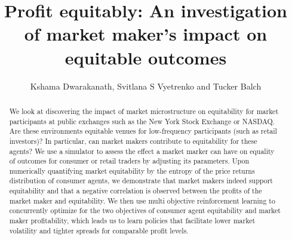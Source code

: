 \documentclass[sigconf]{acmart}
\begin{document}
\setlength{\abovedisplayskip}{3pt}
\setlength{\belowdisplayskip}{3pt}


\title{Profit equitably: An investigation of market maker's impact on equitable outcomes}

\author{Kshama Dwarakanath, Svitlana S Vyetrenko and Tucker Balch}

% 
\begin{abstract}
{
We look at discovering the impact of market microstructure
on equitability for market participants
at public exchanges such as the New York
Stock Exchange or NASDAQ. Are these environments
equitable venues for low-frequency participants
(such as retail investors)? In particular,
can market makers contribute to equitability for
these agents? We use a simulator to assess the effect a market marker can have on equality of outcomes for consumer or retail traders by adjusting its parameters. Upon numerically quantifying market equitability by the entropy of the price returns distribution of consumer agents, we demonstrate that market makers indeed support equitability and that a negative correlation is observed between the profits of the market maker and equitability. We then use multi objective reinforcement learning to concurrently optimize for the two objectives of consumer agent equitability and market maker profitability, which leads us to learn policies that facilitate lower market volatility and tighter spreads for comparable profit levels.
}
\end{abstract}
\end{document}
